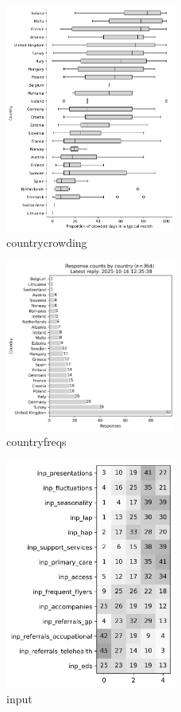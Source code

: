 \documentclass{article}
\begin{document}
\lipsum[1]

\begin{figure}[H]
    \centering
        \includegraphics[width=0.5\textwidth]{../output/plots/country_crowding}
        \caption{countrycrowding}
        \label{fig:country_crowding}
\end{figure}

\begin{figure}[H]
    \centering
        \includegraphics[width=0.5\textwidth]{../output/plots/country_freqs}
        \caption{countryfreqs}
        \label{fig:country_freqs}
\end{figure}

\begin{figure}[H]
    \centering
        \includegraphics[width=0.5\textwidth]{../output/plots/input}
        \caption{input}
        \label{fig:input}
\end{figure}
\end{document}

